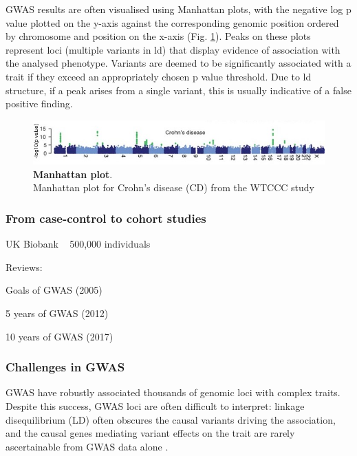GWAS results are often visualised using Manhattan plots, with the negative log p value plotted on the y-axis against the corresponding genomic position ordered by chromosome and position on the x-axis (Fig. \ref{fig:manhattan}). 
Peaks on these plots represent loci (multiple variants in \gls{ld}) that display evidence of association with the analysed phenotype. 
Variants are deemed to be significantly associated with a trait if they exceed an appropriately chosen p value threshold. 
Due to \gls{ld} structure, if a peak arises from a single variant, this is usually indicative of a false positive finding.

\begin{figure}[h]
\centering
\includegraphics[width=15cm]{Chapter1/Fig/Manhattan_plots_CD_WTCCC_2007.jpg}
\caption[Manhattan plot]{\textbf{Manhattan plot}.\\
Manhattan plot for Crohn's disease (CD) from the WTCCC study \cite{wellcome2007genome}}
\label{fig:manhattan}
\end{figure}

\subsubsection{From case-control to cohort studies}

UK Biobank ~ 500,000 individuals \cite{bycroft2018uk}



Reviews:

Goals of GWAS (2005) \cite{hirschhorn2005genome}

5 years of GWAS (2012) \cite{visscher2012five}

10 years of GWAS (2017) \cite{visscher201710}

\subsubsection{Challenges in GWAS}

GWAS have robustly associated thousands of genomic loci with complex traits. 
Despite this success, GWAS loci are often difficult to interpret: linkage disequilibrium (LD) often obscures the causal variants driving the association, and the causal genes mediating variant effects on the trait are rarely ascertainable from GWAS data alone \cite{gallagher2018post, wainberg2019opportunities}. 

